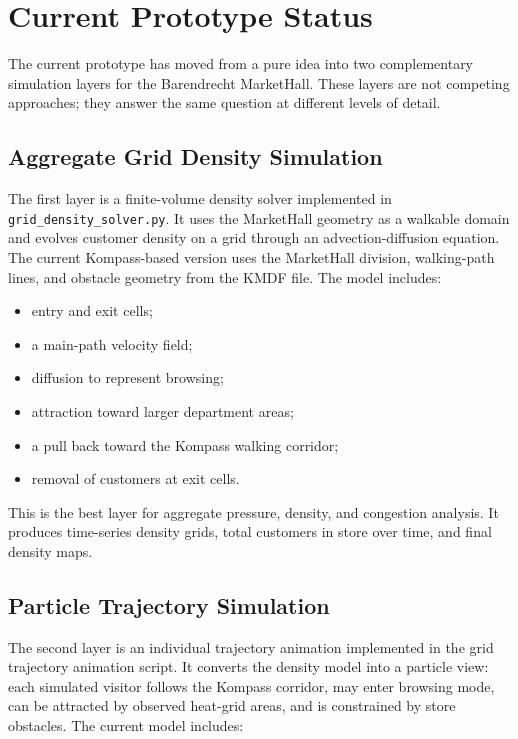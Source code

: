 \documentclass[11pt,a4paper]{article}
\begin{document}
\section{Current Prototype Status}

The current prototype has moved from a pure idea into two complementary simulation layers for the Barendrecht MarketHall. These layers are not competing approaches; they answer the same question at different levels of detail.

\subsection{Aggregate Grid Density Simulation}

The first layer is a finite-volume density solver implemented in \texttt{grid\_density\_solver.py}. It uses the MarketHall geometry as a walkable domain and evolves customer density on a grid through an advection-diffusion equation. The current Kompass-based version uses the MarketHall division, walking-path lines, and obstacle geometry from the KMDF file. The model includes:

\begin{itemize}[leftmargin=*]
    \item entry and exit cells;
    \item a main-path velocity field;
    \item diffusion to represent browsing;
    \item attraction toward larger department areas;
    \item a pull back toward the Kompass walking corridor;
    \item removal of customers at exit cells.
\end{itemize}

This is the best layer for aggregate pressure, density, and congestion analysis. It produces time-series density grids, total customers in store over time, and final density maps.

\subsection{Particle Trajectory Simulation}

The second layer is an individual trajectory animation implemented in the grid trajectory animation script. It converts the density model into a particle view: each simulated visitor follows the Kompass corridor, may enter browsing mode, can be attracted by observed heat-grid areas, and is constrained by store obstacles. The current model includes:
\end{document}
